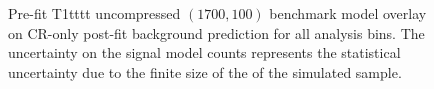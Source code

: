 \begin{figure}[!h]
{        \label{fig:T1tttt_uncompressed_MR_4j}
    } \\
     ~~
     \\
    \caption{
        Pre-fit T1tttt uncompressed $(1700,100)$ benchmark model overlay on
        CR-only post-fit background prediction for all analysis bins. The
        uncertainty on the signal model counts represents the statistical
        uncertainty due to the finite size of the of the simulated sample.
    }
    \label{fig:T1tttt_uncompressed_MR}
\end{figure}

